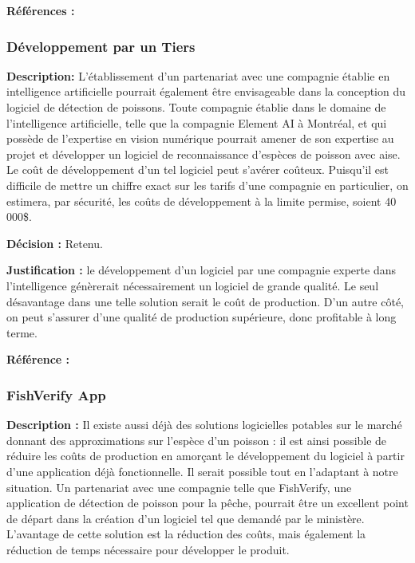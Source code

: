 \textbf{Références :} \cite{requinage}


\subsubsection{Développement par un Tiers}

\textbf{Description: }L’établissement d’un partenariat avec une compagnie établie en intelligence artificielle pourrait également être envisageable dans la conception du logiciel de détection de poissons. Toute compagnie établie dans le domaine de l’intelligence artificielle, telle que la compagnie Element AI à Montréal, et qui possède de l’expertise en vision numérique pourrait amener de son expertise au projet et développer un logiciel de reconnaissance d’espèces de poisson avec aise. Le coût de développement d’un tel logiciel peut s’avérer coûteux. Puisqu’il est difficile de mettre un chiffre exact sur les tarifs d’une compagnie en particulier, on estimera, par sécurité, les coûts de développement à la limite permise, soient 40 000\$.

\textbf{Décision :} Retenu.

\textbf{Justification :} le développement d’un logiciel par une compagnie experte dans l’intelligence génèrerait nécessairement un logiciel de grande qualité. Le seul désavantage dans une telle solution serait le coût de production. D’un autre côté, on peut s’assurer d’une qualité de production supérieure, donc profitable à long terme.

\textbf{Référence :} \cite{elementai}


\subsubsection{FishVerify App}

\textbf{Description :} Il existe aussi déjà des solutions logicielles potables sur le marché donnant des approximations sur l’espèce d’un poisson : il est ainsi possible de réduire les coûts de production en amorçant le développement du logiciel à partir d’une application déjà fonctionnelle. Il serait possible tout en l’adaptant à notre situation. Un partenariat avec une compagnie telle que FishVerify, une application de détection de poisson pour la pêche, pourrait être un excellent point de départ dans la création d’un logiciel tel que demandé par le ministère. L’avantage de cette solution est la réduction des coûts, mais également la réduction de temps nécessaire pour développer le produit.

